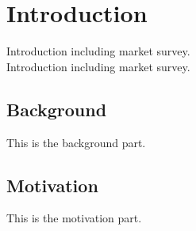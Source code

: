 \section{Introduction} 
Introduction including market survey.\\
Introduction including market survey.\\
\subsection{Background}
This is the background part.
\subsection{Motivation}
This is the motivation part.

\newpage